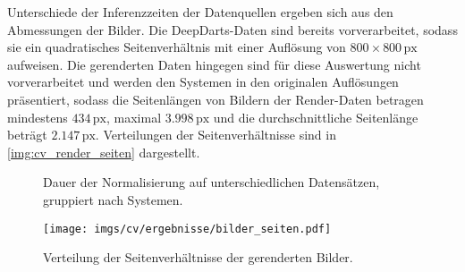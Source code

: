 Unterschiede der Inferenzzeiten der Datenquellen ergeben sich aus den Abmessungen der Bilder. Die DeepDarts-Daten sind bereits vorverarbeitet, sodass sie ein quadratisches Seitenverhältnis mit einer Auflösung von $800 \times 800\,\text{px}$ aufweisen. Die gerenderten Daten hingegen sind für diese Auswertung nicht vorverarbeitet und werden den Systemen in den originalen Auflösungen präsentiert, sodass die Seitenlängen von Bildern der Render-Daten betragen mindestens $434\,\text{px}$, maximal $3.998\,\text{px}$ und die durchschnittliche Seitenlänge beträgt $2.147\,\text{px}$. Verteilungen der Seitenverhältnisse sind in \autoref{img:cv_render_seiten} dargestellt.

\begin{figure}
    \centering
    \caption{Dauer der Normalisierung auf unterschiedlichen Datensätzen, gruppiert nach Systemen.}
    \label{fig:cv_dauer}
\end{figure}

\begin{figure}
    \centering
    \texttt{[image: imgs/cv/ergebnisse/bilder\_seiten.pdf]}
    \caption{Verteilung der Seitenverhältnisse der gerenderten Bilder.}
    \label{img:cv_render_seiten}
\end{figure}

